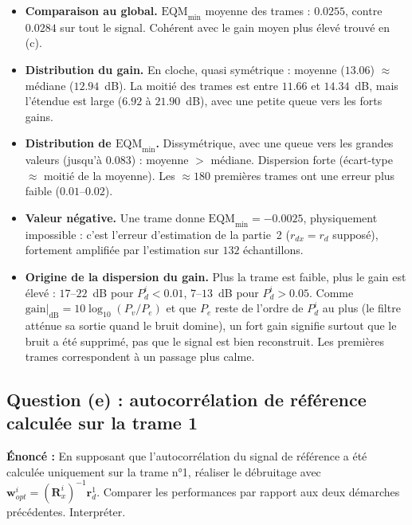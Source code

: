 \begin{interpretation}
\begin{itemize}
  \item \textbf{Comparaison au global.} $\mathrm{EQM}_{\min}$ moyenne des trames : $0.0255$, contre $0.0284$ sur tout le signal. Cohérent avec le gain moyen plus élevé trouvé en (c).
  \item \textbf{Distribution du gain.} En cloche, quasi symétrique : moyenne ($13.06$) $\approx$ médiane ($12.94$~dB). La moitié des trames est entre $11.66$ et $14.34$~dB, mais l'étendue est large ($6.92$ à $21.90$~dB), avec une petite queue vers les forts gains.
  \item \textbf{Distribution de $\mathrm{EQM}_{\min}$.} Dissymétrique, avec une queue vers les grandes valeurs (jusqu'à $0.083$) : moyenne $>$ médiane. Dispersion forte (écart-type $\approx$ moitié de la moyenne). Les $\approx 180$ premières trames ont une erreur plus faible ($0.01$--$0.02$).
  \item \textbf{Valeur négative.} Une trame donne $\mathrm{EQM}_{\min}=-0.0025$, physiquement impossible : c'est l'erreur d'estimation de la partie~2 ($r_{dx}=r_d$ supposé), fortement amplifiée par l'estimation sur $132$ échantillons.
  \item \textbf{Origine de la dispersion du gain.} Plus la trame est faible, plus le gain est élevé : $17$--$22$~dB pour $P^i_d<0.01$, $7$--$13$~dB pour $P^i_d>0.05$. Comme $\mathrm{gain}|_{\mathrm{dB}}=10\log_{10}(P_v/P_e)$ et que $P_e$ reste de l'ordre de $P^i_d$ au plus (le filtre atténue sa sortie quand le bruit domine), un fort gain signifie surtout que le bruit a été supprimé, pas que le signal est bien reconstruit. Les premières trames correspondent à un passage plus calme.
\end{itemize}
\end{interpretation}

\subsection{Question (e) : autocorrélation de référence calculée sur la trame 1}

\begin{enonce}
\textbf{Énoncé :} En supposant que l'autocorrélation du signal de référence a été calculée uniquement sur la trame n°1, réaliser le débruitage avec $\mathbf{w}^i_{opt}=(\mathbf{R}^i_x)^{-1}\mathbf{r}^1_{d}$. Comparer les performances par rapport aux deux démarches précédentes. Interpréter.
\end{enonce}


